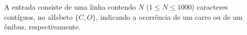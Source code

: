 A entrada consiste de uma linha contendo $N$ ($1 \leq N \leq 1000$) caracteres contíguos, no alfabeto $\{C, O\}$, indicando a ocorrência de um carro ou de um ônibus, respectivamente.